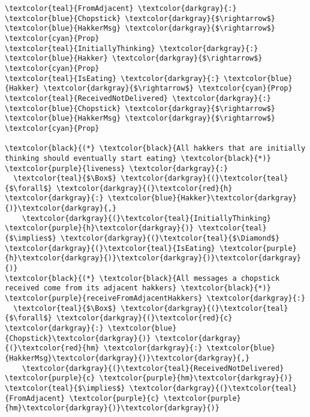 \begin{Verbatim}[commandchars=\\\{\},codes={\catcode`$=3}]
\textcolor{teal}{FromAdjacent} \textcolor{darkgray}{:} \textcolor{blue}{Chopstick} \textcolor{darkgray}{$\rightarrow$} \textcolor{blue}{HakkerMsg} \textcolor{darkgray}{$\rightarrow$} \textcolor{cyan}{Prop}
\textcolor{teal}{InitiallyThinking} \textcolor{darkgray}{:} \textcolor{blue}{Hakker} \textcolor{darkgray}{$\rightarrow$} \textcolor{cyan}{Prop}
\textcolor{teal}{IsEating} \textcolor{darkgray}{:} \textcolor{blue}{Hakker} \textcolor{darkgray}{$\rightarrow$} \textcolor{cyan}{Prop}
\textcolor{teal}{ReceivedNotDelivered} \textcolor{darkgray}{:} \textcolor{blue}{Chopstick} \textcolor{darkgray}{$\rightarrow$} \textcolor{blue}{HakkerMsg} \textcolor{darkgray}{$\rightarrow$} \textcolor{cyan}{Prop}

\textcolor{black}{(*} \textcolor{black}{All hakkers that are initially thinking should eventually start eating} \textcolor{black}{*)}
\textcolor{purple}{liveness} \textcolor{darkgray}{:}
  \textcolor{teal}{$\Box$} \textcolor{darkgray}{(}\textcolor{teal}{$\forall$} \textcolor{darkgray}{(}\textcolor{red}{h} \textcolor{darkgray}{:} \textcolor{blue}{Hakker}\textcolor{darkgray}{)}\textcolor{darkgray}{,}
    \textcolor{darkgray}{(}\textcolor{teal}{InitiallyThinking} \textcolor{purple}{h}\textcolor{darkgray}{)} \textcolor{teal}{$\implies$} \textcolor{darkgray}{(}\textcolor{teal}{$\Diamond$} \textcolor{darkgray}{(}\textcolor{teal}{IsEating} \textcolor{purple}{h}\textcolor{darkgray}{)}\textcolor{darkgray}{)}\textcolor{darkgray}{)}
\textcolor{black}{(*} \textcolor{black}{All messages a chopstick received come from its adjacent hakkers} \textcolor{black}{*)}
\textcolor{purple}{receiveFromAdjacentHakkers} \textcolor{darkgray}{:}
  \textcolor{teal}{$\Box$} \textcolor{darkgray}{(}\textcolor{teal}{$\forall$} \textcolor{darkgray}{(}\textcolor{red}{c} \textcolor{darkgray}{:} \textcolor{blue}{Chopstick}\textcolor{darkgray}{)} \textcolor{darkgray}{(}\textcolor{red}{hm} \textcolor{darkgray}{:} \textcolor{blue}{HakkerMsg}\textcolor{darkgray}{)}\textcolor{darkgray}{,}
    \textcolor{darkgray}{(}\textcolor{teal}{ReceivedNotDelivered} \textcolor{purple}{c} \textcolor{purple}{hm}\textcolor{darkgray}{)} \textcolor{teal}{$\implies$} \textcolor{darkgray}{(}\textcolor{teal}{FromAdjacent} \textcolor{purple}{c} \textcolor{purple}{hm}\textcolor{darkgray}{)}\textcolor{darkgray}{)}
\end{Verbatim}
